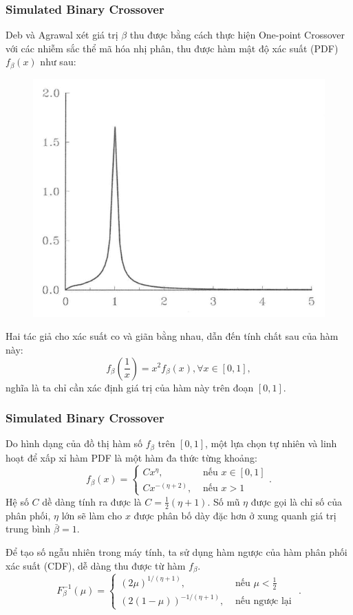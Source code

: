 \begin{frame}[fragile]
\frametitle{Simulated Binary Crossover}
Deb và Agrawal xét giá trị \( \beta \) thu được bằng cách thực hiện One-point
Crossover với các nhiễm sắc thể mã hóa nhị phân, thu được hàm mật độ xác suất
(PDF) \( f_{\beta}(x) \) như sau:
\begin{figure}
  \centering
  \includegraphics[height=.25\textheight]{res/sbx_pdf.png}
  \captionsetup{belowskip=0pt}
\end{figure}
Hai tác giả cho xác suất co và giãn bằng nhau, dẫn đến tính chất sau của hàm này:
\[
  f_{\beta} \left( \frac{1}{x} \right) = x^2 f_{\beta}(x), \forall x \in [0, 1]
,\] nghĩa là ta chỉ cần xác định giá trị của hàm này trên đoạn \( [0, 1] \).
\end{frame}

\begin{frame}[fragile]
\frametitle{Simulated Binary Crossover}
Do hình dạng của đồ thị hàm số \( f_{\beta} \) trên \( [0, 1] \), một lựa chọn
tự nhiên và linh hoạt để xấp xỉ hàm PDF là một hàm đa thức từng khoảng:
\[
  f_{\beta}(x) = \begin{cases}
    Cx^{\eta}, &\text{ nếu }x \in [0, 1]\\
    Cx^{-(\eta + 2)}, &\text{ nếu }x > 1
  \end{cases}
.\] 
Hệ số \( C \) dề dàng tính ra được là \( C = \frac{1}{2}(\eta  + 1) \). Số mũ \(
\eta 
\) được gọi là chỉ số của phân phối, \( \eta  \) lớn sẽ làm cho \( x \) được phân bố
dày đặc hơn ở xung quanh giá trị trung bình \( \bar{\beta} = 1 \).

Để tạo số ngẫu nhiên trong máy tính, ta sử dụng hàm ngược của hàm phân phối xác
suất (CDF), dễ dàng thu được từ hàm \( f_{\beta} \).
\[
  F^{-1}_{\beta}(\mu) = \begin{cases}
    (2\mu )^{1/(\eta  + 1)}, &\text{ nếu }\mu  < \frac{1}{2}\\
    (2(1 - \mu))^{-1/(\eta +1)}, &\text{ nếu ngược lại }
  \end{cases}
.\] 
\end{frame}

